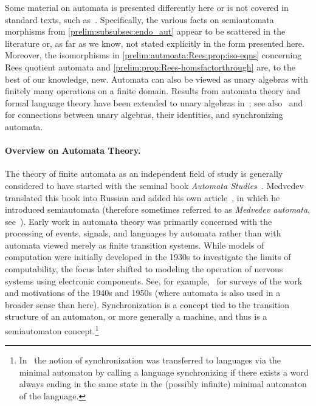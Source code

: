 
Some material on automata is presented differently here or is not covered in standard texts, such as~\cite{HopUll79,Ito04,DBLP:books/daglib/0088160}. Specifically, the various facts on semiautomata morphisms from \cref{prelim:subsubsec:endo_aut} appear to be scattered in the literature or, as far as we know, not stated explicitly in the form presented here.
Moreover, the isomorphisms in \cref{prelim:autmoata:Rees:prop:iso-eqns} concerning Rees quotient automata 
and \cref{prelim:prop:Rees-homsfactorthrough} are, to the best of our knowledge, new.
Automata can also be viewed as unary algebras with finitely many operations on a finite domain. Results from automata theory and formal language theory have been extended to unary algebras in~\cite{DBLP:journals/tcs/PetkovicCB04}; see also~\cite[p.~835]{Volkov22} and~\cite{Bogdanovic99} for connections between unary algebras, their identities, and synchronizing automata.


\paragraph{Overview on Automata Theory.} The theory of finite automata as an independent field of study is generally considered to have started with the seminal book 
\emph{Automata Studies}~\cite{ShannonM56}. Medvedev translated this book into Russian and added his own article~\cite{Medvedev56}, in which he introduced semiautomata (therefore sometimes referred to as \emph{Medvedev automata}, see~\cite{DBLP:conf/birthday/Salomaa12,Volkov22}). Early work in automata theory was primarily concerned with the processing of events, signals, and languages by automata rather than with automata viewed merely as finite transition systems.
While models of computation were initially developed in the 1930s to investigate the limits of computability, the focus later shifted to modeling the operation of nervous systems using electronic components. See, for example,~\cite{vonNeumann1951GeneralLogicalTheoryAutomata,Shannon1953ComputersAutomata} for surveys of the work and motivations of the 1940s and 1950s (where automata is also used in a broader sense than here).
Synchronization is a concept tied to the transition structure of an automaton,
or more generally a machine, and thus is a semiautomaton concept.\footnote{In~\cite{HolzerJ18} the notion of synchronization
	was transferred to languages via the minimal automaton
	by calling a language synchronizing if there exists a word
	always ending in the same state in the (possibly infinite) 
	minimal automaton of the language.}

